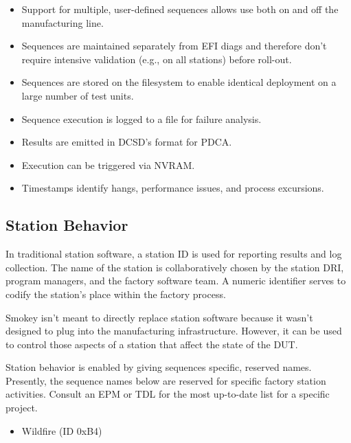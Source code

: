 \begin{itemize}

\item Support for multiple, user-defined sequences allows use both on and off
the manufacturing line.

\item Sequences are maintained separately from EFI diags and therefore don't
require intensive validation (e.g., on all stations) before roll-out.

\item Sequences are stored on the filesystem to enable identical deployment on
a large number of test units.

\item Sequence execution is logged to a file for failure analysis.

\item Results are emitted in DCSD's format for PDCA.

\item Execution can be triggered via NVRAM.

\item Timestamps identify hangs, performance issues, and process excursions.

\end{itemize}

\subsection{Station Behavior}

In traditional station software, a station ID is used for reporting results and
log collection.  The name of the station is collaboratively chosen by the
station DRI, program managers, and the factory software team.  A numeric
identifier serves to codify the station's place within the factory process.

Smokey isn't meant to directly replace station software because it wasn't
designed to plug into the manufacturing infrastructure.  However, it can be
used to control those aspects of a station that affect the state of the DUT.

Station behavior is enabled by giving sequences specific, reserved names.
Presently, the sequence names below are reserved for specific factory station
activities.  Consult an EPM or TDL for the most up-to-date list for a specific
project.

\begin{itemize}

\item Wildfire (ID 0xB4)

\end{itemize}

